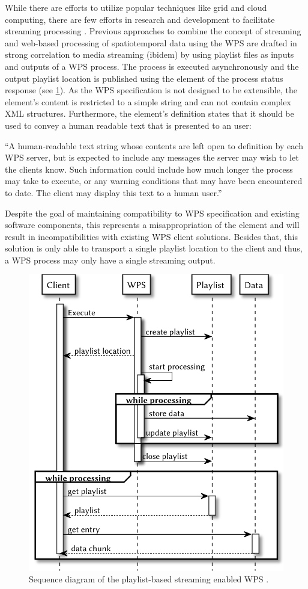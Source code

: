 While there are efforts to utilize popular techniques like grid and cloud computing, there are few efforts in research and development to facilitate streaming processing \citep{foerster2012live}. Previous approaches to combine the concept of streaming and web-based processing of spatiotemporal data using the \ac{WPS} are drafted in strong correlation to media streaming (ibidem) by using playlist files \citep{ietf:draft-pantos-http-live-streaming-12} as inputs and outputs of a \ac{WPS} process. The process is executed asynchronously and the output playlist location is published using the  element of the process status response (see \cref{fig:sd:previous}). As the \ac{WPS} specification is not designed to be extensible, the element's content is restricted to a simple string and can not contain complex \ac{XML} structures. Furthermore, the element's definition states that it should be used to convey a human readable text that is presented to an user:
\begin{xquote}
  ``A human-readable text string whose contents are left open to definition by each WPS server, but is expected to include any messages the server may wish to let the clients know. Such information could include how much longer the process may take to execute, or any warning conditions that may have been encountered to date. The client may display this text to a human user.''
\end{xquote}
Despite the goal of maintaining compatibility to \ac{WPS} specification and existing software components, this represents a misappropriation of the element and will result in incompatibilities with existing \ac{WPS} client solutions. Besides that, this solution is only able to transport a single playlist location to the client and thus, a \ac{WPS} process may only have a single streaming output.

\begin{figure}[!htb]
  \centering
  \includegraphics[width = 0.54225352112676062\linewidth]{figures/sequence-diagram-previous.pdf}
  \caption{\label{fig:sd:previous}Sequence diagram of the playlist-based streaming enabled WPS \citep{foerster2012live}.}
\end{figure}

